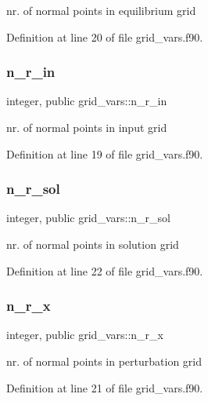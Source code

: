 nr. of normal points in equilibrium grid 



Definition at line 20 of file grid\+\_\+vars.\+f90.

\mbox{\label{namespacegrid__vars_ad1047cc6f07720d61c8e6fdc3c68a317}} 
\subsubsection{\texorpdfstring{n\+\_\+r\+\_\+in}{n\_r\_in}}
{\footnotesize\ttfamily integer, public grid\+\_\+vars\+::n\+\_\+r\+\_\+in}



nr. of normal points in input grid 



Definition at line 19 of file grid\+\_\+vars.\+f90.

\mbox{\label{namespacegrid__vars_ad998db12a656afb94d2d54a7d0eca642}} 
\subsubsection{\texorpdfstring{n\+\_\+r\+\_\+sol}{n\_r\_sol}}
{\footnotesize\ttfamily integer, public grid\+\_\+vars\+::n\+\_\+r\+\_\+sol}



nr. of normal points in solution grid 



Definition at line 22 of file grid\+\_\+vars.\+f90.

\mbox{\label{namespacegrid__vars_abee8a41de92fe25b2d3dfaf472b02cd2}} 
\subsubsection{\texorpdfstring{n\+\_\+r\+\_\+x}{n\_r\_x}}
{\footnotesize\ttfamily integer, public grid\+\_\+vars\+::n\+\_\+r\+\_\+x}



nr. of normal points in perturbation grid 



Definition at line 21 of file grid\+\_\+vars.\+f90.


